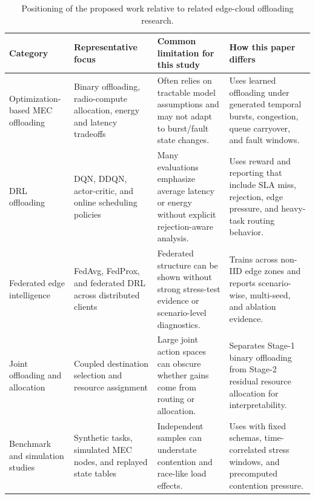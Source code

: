 \begin{table}[!t]
\centering
\caption{Positioning of the proposed work relative to related edge-cloud offloading research.}
\label{tab:related_taxonomy}
\scriptsize
\begin{tabularx}{\textwidth}{@{}lXXX@{}}
\toprule
Category & Representative focus & Common limitation for this study & How this paper differs \\
\midrule
Optimization-based MEC offloading & Binary offloading, radio-compute allocation, energy and latency tradeoffs \cite{ref17,ref18,ref19} & Often relies on tractable model assumptions and may not adapt to burst/fault state changes. & Uses learned offloading under generated temporal bursts, congestion, queue carryover, and fault windows. \\
DRL offloading & DQN, DDQN, actor-critic, and online scheduling policies \cite{ref03,ref07,ref12} & Many evaluations emphasize average latency or energy without explicit rejection-aware analysis. & Uses reward and reporting that include SLA miss, rejection, edge pressure, and heavy-task routing behavior. \\
Federated edge intelligence & FedAvg, FedProx, and federated DRL across distributed clients \cite{ref02,ref04,ref05,ref06,ref30,ref31} & Federated structure can be shown without strong stress-test evidence or scenario-level diagnostics. & Trains across non-IID edge zones and reports scenario-wise, multi-seed, and ablation evidence. \\
Joint offloading and allocation & Coupled destination selection and resource assignment \cite{ref17,ref18,ref19} & Large joint action spaces can obscure whether gains come from routing or allocation. & Separates Stage-1 binary offloading from Stage-2 residual resource allocation for interpretability. \\
Benchmark and simulation studies & Synthetic tasks, simulated MEC nodes, and replayed state tables \cite{ref24,ref28} & Independent samples can understate contention and race-like load effects. & Uses \dataset{} with fixed schemas, time-correlated stress windows, and precomputed contention pressure. \\
\bottomrule
\end{tabularx}
\end{table}

